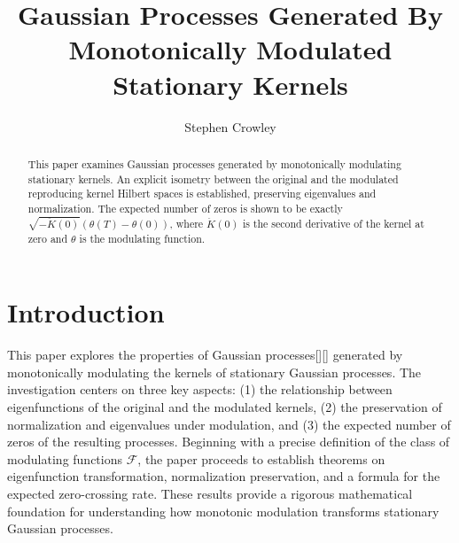 \documentclass{mc}
\begin{document}

\title[Modulated Gaussian Processes]{Gaussian Processes Generated By Monotonically Modulated Stationary Kernels}

\author[Stephen Crowley]{Stephen Crowley\corrauth}

\begin{abstract}
This paper examines Gaussian processes generated by monotonically modulating stationary kernels. An explicit isometry between the original and the modulated reproducing kernel Hilbert spaces is established, preserving eigenvalues and normalization. The expected number of zeros is shown to be exactly $\sqrt{-\ddot{K}(0)}(\theta(T)-\theta(0))$, where $\ddot{K}(0)$ is the second derivative of the kernel at zero and $\theta$ is the modulating function.
\end{abstract}



\maketitle

\section{Introduction}

This paper explores the properties of Gaussian
processes[\cite{correlationTheoryOfStationaryRandomProcesses}][\cite{stationaryAndRelatedStochasticProcesses}]
generated by
monotonically modulating the kernels of stationary Gaussian processes. The
investigation centers on three key aspects: (1) the relationship between
eigenfunctions of the original and the modulated kernels, (2) the preservation
of normalization and eigenvalues under modulation, and (3) the expected number
of zeros of the resulting processes. Beginning with a precise definition of
the class of modulating functions $\mathcal{F}$, the paper proceeds to
establish theorems on eigenfunction transformation, normalization
preservation, and a formula for the expected zero-crossing rate. These results
provide a rigorous mathematical foundation for understanding how monotonic
modulation transforms stationary Gaussian processes.
\end{document}
